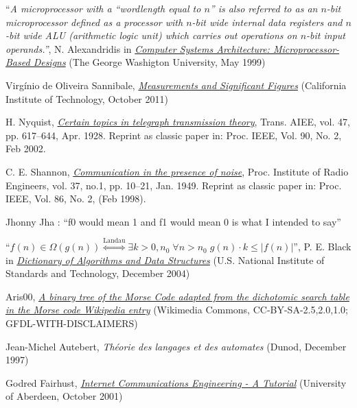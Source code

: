 \documentclass[twocolumn,pre,floats,aps,amsmath,amssymb]{revtex4}
\begin{document}
\begin{thebibliography}{99}
``{\it A microprocessor with a ``wordlength equal to $n$'' is also referred to as an $n$-bit microprocessor defined as a processor with $n$-bit wide internal data registers and $n$-bit wide ALU (arithmetic logic unit) which carries out operations on $n$-bit input operands.''}, N. Alexandridis in {\it \href{http://www.student.seas.gwu.edu/~kallitec/ece201/TextbookFigures/000-Chapter1.pdf}{Computer Systems Architecture: Microprocessor-Based Designs}} (The George Washigton University, May 1999)

Virg\'inio de Oliveira Sannibale, {\it \href{http://www.ligo.caltech.edu/~vsanni/ph3/SignificantFiguresAndMeasurements/SignificantFiguresAndMeasurements.pdf}{Measurements and Significant Figures}} (California Institute of Technology, October 2011)

H. Nyquist, {\it \href{http://replay.web.archive.org/20060706192816/http://www.loe.ee.upatras.gr/Comes/Notes/Nyquist.pdf}{Certain topics in telegraph transmission theory}}, Trans. AIEE, vol. 47, pp. 617–644, Apr. 1928. Reprint as classic paper in: Proc. IEEE, Vol. 90, No. 2, Feb 2002.

C. E. Shannon, {\it \href{http://www.stanford.edu/class/ee104/shannonpaper.pdf}{Communication in the presence of noise}}, Proc. Institute of Radio Engineers, vol. 37, no.1, pp. 10–21, Jan. 1949. Reprint as classic paper in: Proc. IEEE, Vol. 86, No. 2, (Feb 1998).

 Jhonny Jha : ``f0 would mean 1 and f1 would mean 0 is what I intended to say''

 ``$f(n) \in \Omega \left ( g(n) \right ) \stackrel{\mathrm{Landau}}{\Leftrightarrow} \exists k>0, n_0 \; \forall n>n_0 \; g(n)\cdot k \leq |f(n)|$'', P. E. Black in {\it \href{http://www.nist.gov/dads/}{Dictionary of Algorithms and Data Structures}} (U.S. National Institute of Standards and Technology, December 2004)

 Aris00, {\it \href{http://en.wikipedia.org/wiki/File:Morse_code_tree3.png}{A binary tree of the Morse Code adapted from the dichotomic search table in the Morse code Wikipedia entry}} (Wikimedia Commons, CC-BY-SA-2.5,2.0,1.0; GFDL-WITH-DISCLAIMERS)

Jean-Michel Autebert, {\it Th\'eorie des langages et des automates} (Dunod, December 1997)

Godred Fairhust, {\it \href{http://www.erg.abdn.ac.uk/~gorry/eg3567/phy-pages/nrz.html}{Internet Communications Engineering - A Tutorial}} (University of Aberdeen, October 2001)

\end{thebibliography}
\end{document}
